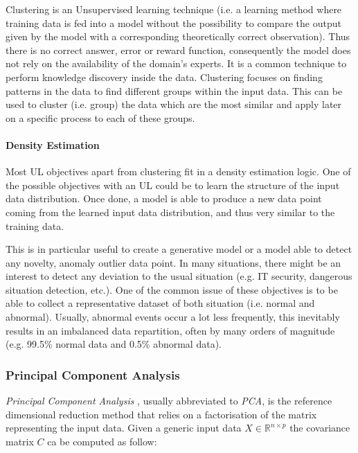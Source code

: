 Clustering is an Unsupervised learning technique (i.e. a learning method where training data is fed into a model without the possibility to compare the output given by the model with a corresponding theoretically correct observation). Thus there is no correct answer, error or reward function, consequently the model does not rely on the availability of the domain’s experts. It is a common technique to perform knowledge discovery inside the data. Clustering focuses on finding patterns in the data to find different groups within the input data. This can be used to cluster (i.e. group) the data which are the most similar and apply later on a specific process to each of these groups.

\paragraph{Density Estimation}

Most UL objectives apart from clustering fit in a density estimation logic. One of the possible objectives with an UL could be to learn the structure of the input data distribution. Once done, a model is able to produce a new data point coming from the learned input data distribution, and thus very similar to the training data. 

This is in particular useful to create a generative model or a model able to detect any novelty, anomaly outlier data point. In many situations, there might be an interest to detect any deviation to the usual situation (e.g. IT security, dangerous situation detection, etc.). One of the common issue of these objectives is to be able to collect a representative dataset of both situation (i.e. normal and abnormal). Usually, abnormal events occur a lot less frequently, this inevitably results in an imbalanced data repartition, often by many orders of magnitude (e.g. 99.5\% normal data and 0.5\% abnormal data).


\subsubsection{Principal Component Analysis} \label{Principal Component Analysis}

\textit{Principal Component Analysis} \citep{pearson1901liii}\citep{hotelling1933analysis}, usually abbreviated to \textit{PCA}, is the reference dimensional reduction method that relies on a factorisation of the matrix representing the input data. Given a generic input data $X \in \mathbb{R}^{n \times p}$ the covariance matrix $C$ ca be computed as follow:

